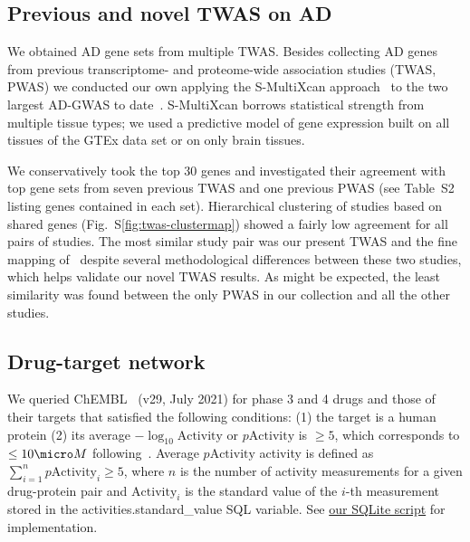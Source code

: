 \documentclass[letterpaper]{article}
\begin{document}
\subsection{Previous and novel TWAS on AD}

We obtained AD gene sets from multiple TWAS.  Besides collecting
AD genes from previous transcriptome- and proteome-wide association studies
(TWAS, PWAS) we
conducted our own applying the S-MultiXcan approach~\citep{Barbeira2018} to
the two largest AD-GWAS to date~\citep{Schwartzentruber2021,Wightman2021}.
S-MultiXcan borrows statistical strength from multiple tissue types; we used a
predictive model of gene expression built on all tissues of the GTEx data set
or on only brain tissues.

We conservatively took the top 30 genes and investigated their agreement with
top gene sets from seven previous TWAS and one previous PWAS (see Table~S2
listing genes contained in each set).  Hierarchical clustering of studies
based on shared genes (Fig.~S\ref{fig:twas-clustermap}) showed a fairly low
agreement for all pairs of studies.  The most similar study pair was our
present TWAS and the fine mapping of~\cite{Jansen2019} despite several
methodological differences between these two studies, which helps validate our
novel TWAS results.  As might be expected, the least similarity was found
between the only PWAS in our collection and all the other studies.

\subsection{Drug-target network}

We queried ChEMBL~\citep{Gaulton2017} (v29, July 2021) for phase 3 and 4 drugs
and those of their targets that satisfied the following conditions: (1) the
target is a human protein (2) its average $-\log_{10}\mathrm{Activity}$ or
$p\mathrm{Activity}$ is $\ge 5$, which corresponds to $\le 10 \micro M$
following~\cite{Cheng2018}.  Average $p\mathrm{Activity}$ activity is defined
as $\sum_{i=1}^n p\mathrm{Activity}_i \ge 5$, where $n$ is the number of
activity measurements for a given drug-protein pair and $\mathrm{Activity}_i$
is the standard value of the $i$-th measurement stored in the
activities.standard\_value SQL variable.  See
\href{https://github.com/attilagk/CTNS-notebook/blob/main/2021-10-24-chembl-query/drug_target_avg_activity.sql}{our SQLite script} for implementation.
\end{document}
